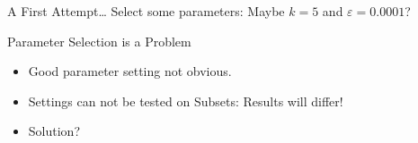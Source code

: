 \documentclass{beamer}
\begin{document}
\begin{frame}{A First Attempt\ldots}
    Select some parameters: \alert{Maybe $k = 5$ and $\varepsilon = 0.0001$}?
    \begin{center}
    \end{center}
\end{frame}
\begin{frame}{Parameter Selection is a Problem}
    \begin{itemize}
        \item Good parameter setting not obvious. 
        \item Settings can not be tested on Subsets: \alert{Results will differ!}
        \item Solution?
    \end{itemize}
\end{frame}
\end{document}
